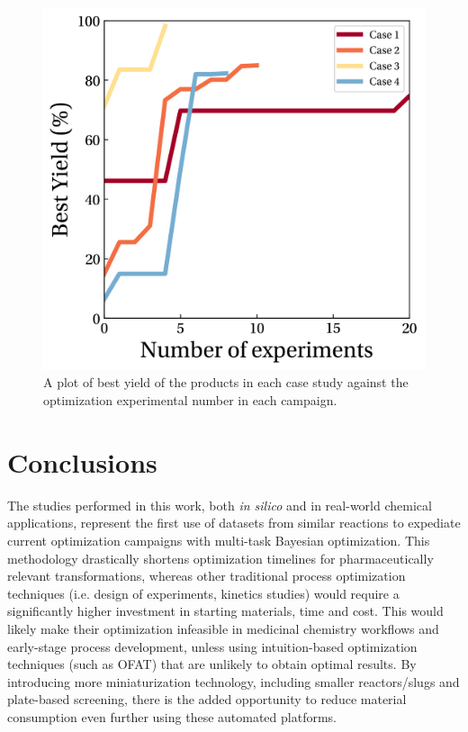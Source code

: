 \begin{figure}
    \centering
    \includegraphics[width=\textwidth]{gfx/Chapter03/ch_activation_optimization_curves.png}
    \caption{A plot of best yield of the products in each case study against the optimization experimental number in each campaign.}
    \label{fig:optimization_curves}
\end{figure}


\section{Conclusions}

The studies performed in this work, both \textit{in silico} and in real-world chemical applications, represent the first use of datasets from similar reactions to expediate current optimization campaigns with multi-task Bayesian optimization. This methodology drastically shortens optimization timelines for pharmaceutically relevant transformations, whereas other traditional process optimization techniques (i.e. design of experiments, kinetics studies) would require a significantly higher investment in starting materials, time and cost. This would likely make their optimization infeasible in medicinal chemistry workflows and early-stage process development, unless using intuition-based optimization techniques (such as OFAT) that are unlikely to obtain optimal results. By introducing more miniaturization technology, including smaller reactors/slugs and plate-based screening, there is the added opportunity to reduce material consumption even further using these automated platforms.

